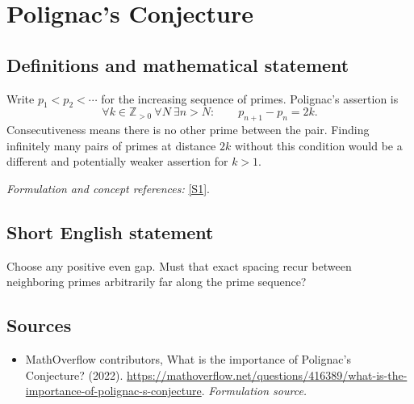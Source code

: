 \documentclass[11pt]{article}
\begin{document}
\section*{\texorpdfstring{Polignac's Conjecture}{Polignac's Conjecture}}\label{1153}
\subsection{Definitions and mathematical statement}
Write $p_1<p_2<\cdots$ for the increasing sequence of primes. Polignac's assertion is
\[
 \forall k\in{\mathbb{Z}}_{>0}\ \forall N\ \exists n>N:\qquad p_{n+1}-p_n=2k.
\]
Consecutiveness means there is no other prime between the pair. Finding infinitely many pairs of primes at distance $2k$ without this condition would be a different and potentially weaker assertion for $k>1$.
\par\smallskip\textit{Formulation and concept references:} \href{https://mathoverflow.net/questions/416389/what-is-the-importance-of-polignac-s-conjecture}{[S1]}.

\subsection{Short English statement}
Choose any positive even gap. Must that exact spacing recur between neighboring primes arbitrarily far along the prime sequence?
\subsection{Sources}
\begin{itemize}
\item[S1]MathOverflow contributors, What is the importance of Polignac's Conjecture? (2022).
\url{https://mathoverflow.net/questions/416389/what-is-the-importance-of-polignac-s-conjecture}.
\textit{Formulation source.}
\end{itemize}
\end{document}
